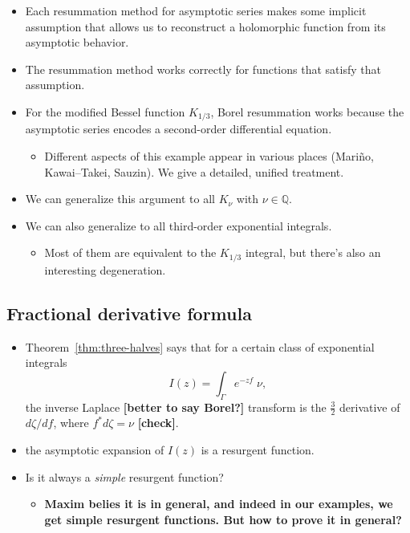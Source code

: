 \documentclass{article}
\theoremstyle{definition}
\begin{document}
\color{black}
\begin{itemize}
\item Each resummation method for asymptotic series makes some implicit assumption that allows us to reconstruct a holomorphic function from its asymptotic behavior.
\item The resummation method works correctly for functions that satisfy that assumption.
\item For the modified Bessel function $K_{1/3}$, Borel resummation works because the asymptotic series encodes a second-order differential equation.
\begin{itemize}
\item Different aspects of this example appear in various places (Mari\~{n}o, Kawai--Takei, Sauzin). We give a detailed, unified treatment.
\end{itemize}
\item We can generalize this argument to all $K_\nu$ with $\nu \in \mathbb{Q}$.
\item We can also generalize to all third-order exponential integrals.
\begin{itemize}
\item Most of them are equivalent to the $K_{1/3}$ integral, but there's also an interesting degeneration.
\end{itemize}
\end{itemize}
\color{black}
\subsection{Fractional derivative formula}
\begin{itemize}
\item Theorem~\ref{thm:three-halves} says that for a certain class of exponential integrals
\[ I(z) = \int_\Gamma e^{-zf}\;\nu, \]
the inverse Laplace \textbf{[better to say Borel?]} transform is the $\tfrac{3}{2}$ derivative of $d\zeta/df$, where $f^* d\zeta = \nu$ \textbf{[check]}.
\item the asymptotic expansion of $I(z)$ is a resurgent function.
\item Is it always a \emph{simple} resurgent function?
\begin{itemize}
\item \textbf{Maxim belies it is in general, and indeed in our examples, we get simple resurgent functions. But how to prove it in general?}
\end{itemize} 
\end{itemize}
\end{document}
